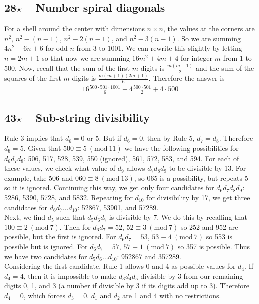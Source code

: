 \documentclass{article}
\newcommand{\Mod}[1]{\ (\mathrm{mod}\ #1)}
\begin{document}
\subsection*{28$\star$ -- Number spiral diagonals} 
For a shell around the center with dimensions $n \times n$, the values at the corners are $n^2$, $n^2 - (n-1)$, $n^2 - 2(n-1)$, and $n^2 - 3(n-1)$. 
So we are summing $4n^2 - 6n + 6$ for odd $n$ from 3 to 1001. 
We can rewrite this slightly by letting $n = 2m+1$ so that now we are summing $16m^2 + 4m + 4$ for integer $m$ from 1 to 500. 
Now, recall that the sum of the first $m$ digits is $\frac{m(m+1)}{2}$ and the sum of the squares of the first $m$ digits is $\frac{m(m+1)(2m+1)}{6}$. 
Therefore the answer is 
\begin{align*}
	\boxed{ 16 \frac{500 \cdot 501 \cdot 1001}{6} + 4 \frac{500 \cdot 501}{2} + 4 \cdot 500 }
\end{align*}

\subsection*{43$\star$ -- Sub-string divisibility} 
Rule 3 implies that $d_6 = 0$ or 5. 
But if $d_6=0$, then by Rule 5, $d_7=d_8$. 
Therefore $d_6 = 5$. 
Given that $500 \equiv 5 \Mod{11}$ we have the following possibilities for $d_6d_7d_8$: 506, 517, 528, 539, 550 (ignored), 561, 572, 583, and 594. 
For each of these values, we check what value of $d_9$ allows $d_7d_8d_9$ to be divisible by 13. 
For example, take 506 and $060 \equiv 8 \Mod{13}$, so $065$ is a possibility, but repeats 5 so it is ignored. 
Continuing this way, we get only four candidates for $d_6d_7d_8d_9$: 5286, 5390, 5728, and 5832. 
Repeating for $d_{10}$ for divisibility by 17, we get three candidates for $d_6d_7\dotsc d_{10}$: 52867, 53901, and 57289. \\

Next, we find $d_5$ such that $d_5d_6d_7$ is divisible by 7. 
We do this by recalling that $100 \equiv 2 \Mod{7}$. 
Then for $d_6d_7 = 52$, $52 \equiv 3 \Mod{7}$ so 252 and 952 are possible, but the first is ignored. 
For $d_6d_7 = 53$, $53 \equiv 4 \Mod{7}$ so 553 is possible but is ignored. 
For $d_6d_7=57$, $57 \equiv 1 \Mod{7}$ so 357 is possible. 
Thus we have two candidates for $d_5d_6\dotsc d_{10}$: 952867 and 357289. \\

Considering the first candidate, Rule 1 allows 0 and 4 as possible values for $d_4$. 
If $d_4 = 4$, then it is impossible to make $d_3d_4d_5$ divisible by 3 from our remaining digits 0, 1, and 3 (a number if divisible by 3 if its digits add up to 3). 
Therefore $d_4 = 0$, which forces $d_3=0$. 
$d_1$ and $d_2$ are 1 and 4 with no restrictions. \\
\end{document}
